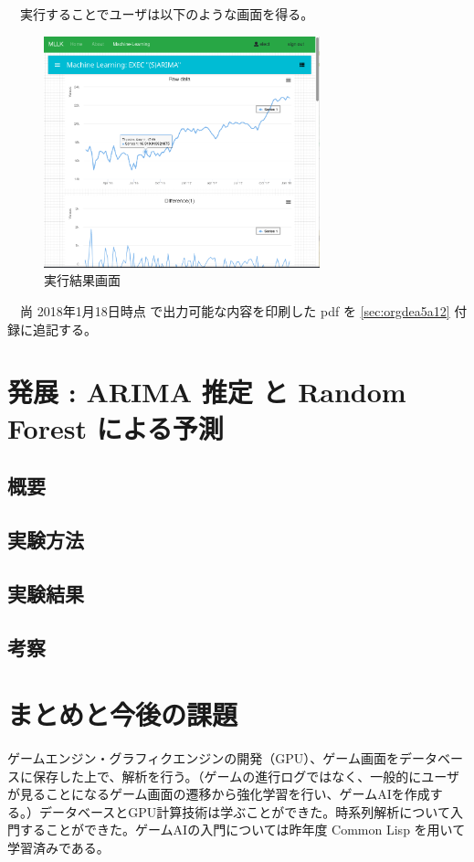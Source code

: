 \documentclass[dvipdfmx]{scrartcl}
\begin{document}
　実行することでユーザは以下のような画面を得る。\\
\begin{figure}[htbp]
\centering
\includegraphics[width=8cm]{./arima-view.PNG}
\caption{実行結果画面}
\end{figure}

　尚 2018年1月18日時点 で出力可能な内容を印刷した pdf を \ref{sec:orgdea5a12} 付録に追記する。\\
\section{発展 : ARIMA 推定 と Random Forest による予測}
\label{sec:org7bf607b}
\subsection{概要}
\label{sec:org495767d}
\subsection{実験方法}
\label{sec:orgfd768f1}
\subsection{実験結果}
\label{sec:org983ccd5}
\subsection{考察}
\label{sec:org06837f3}
\section{まとめと今後の課題}
\label{sec:org7b0b1bb}
ゲームエンジン・グラフィクエンジンの開発（GPU）、ゲーム画面をデータベースに保存した上で、解析を行う。（ゲームの進行ログではなく、一般的にユーザが見ることになるゲーム画面の遷移から強化学習を行い、ゲームAIを作成する。）データベースとGPU計算技術は学ぶことができた。時系列解析について入門することができた。ゲームAIの入門については昨年度 Common Lisp を用いて学習済みである。\\
\end{document}
